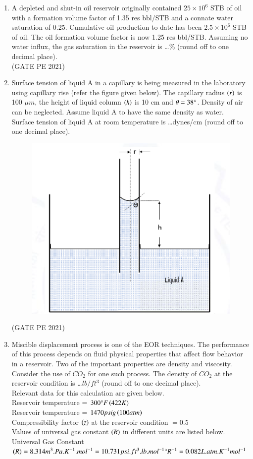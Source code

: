 \documentclass[journal,12pt,onecolumn]{IEEEtran}
\theoremstyle{remark}
\begin{document}
\begin{enumerate}
\item A depleted and shut-in oil reservoir originally contained $25\times10^6$ STB of oil with a formation volume factor of 1.35 res bbl/STB and a connate water saturation of 0.25. Cumulative oil production to date has been $2.5\times10^6$ STB of oil. The oil formation volume factor is now 1.25 res bbl/STB. Assuming no water influx, the gas saturation in the reservoir is \dots \% (round off to one decimal place).\\

\hfill{(GATE PE 2021)}

\item Surface tension of liquid A in a capillary is being measured in the laboratory using capillary rise (refer the figure given below). The capillary radius $\left(r\right)$ is 100 $\mu m$, the height of liquid column $\left(h\right)$ is 10 cm and $\theta=38\degree$. Density of air can be neglected. Assume liquid A to have the same density as water.\\
Surface tension of liquid A at room temperature is \dots dynes/cm (round off to one decimal place).\\
\begin{figure}[h]
    \centering
    \includegraphics[width=0.5\columnwidth]{Q_53.png}
    \caption{}
    \label{fig:placeholder}
\end{figure}

\hfill{(GATE PE 2021)}

\item Miscible displacement process is one of the EOR techniques. The performance of this process depends on fluid physical properties that affect flow behavior in a reservoir. Two of the important properties are density and viscosity. Consider the use of $CO_2$ for one such process. The density of $CO_2$ at the reservoir condition is \dots $lb/ft^3$ (round off to one decimal place).\\
Relevant data for this calculation are given below.\\
Reservoir temperature = $300\degree F\left(422K\right)$\\
Reservoir temperature = $1470 psig \left(100atm\right)$\\
Compressibility factor $\left(z\right)$ at the reservoir condition $=0.5$\\
Values of universal gas constant $\left(R\right)$ in different units are listed below.\\
Universal Gas Constant $\left(R\right)=8.314m^3.Pa.K^{-1}.mol^{-1}=10.731psi.ft^3.lb.mol^{-1}\degree R^{-1}=0.082L.atm.K^{-1}mol^{-1}$\\


\end{enumerate}
\end{document}

